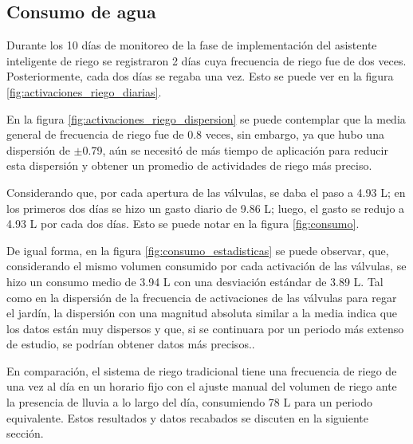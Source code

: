 \documentclass[pdflatex,sn-mathphys-num]{sn-jnl}%
\theoremstyle{thmstyleone}%
\theoremstyle{thmstyletwo}%
\theoremstyle{thmstylethree}%
\begin{document}
\begin{multicols}{2}
\justifying
\subsection*{Consumo de agua}
Durante los 10 días de monitoreo de la fase de implementación del asistente inteligente de riego se registraron 2 días cuya frecuencia de riego fue de dos veces. Posteriormente, cada dos días se regaba una vez. Esto se puede ver en la figura \ref{fig:activaciones_riego_diarias}.

En la figura \ref{fig:activaciones_riego_dispersion} se puede contemplar que la media general de frecuencia de riego fue de 0.8 veces, sin embargo, ya que hubo una dispersión de $\pm$0.79, aún se necesitó de más tiempo de aplicación para reducir esta dispersión y obtener un promedio de actividades de riego más preciso.

Considerando que, por cada apertura de las válvulas, se daba el paso a 4.93 L; en los primeros dos días se hizo un gasto diario de 9.86 L; luego, el gasto se redujo a 4.93 L por cada dos días. Esto se puede notar en la figura \ref{fig:consumo}.

De igual forma, en la figura \ref{fig:consumo_estadisticas} se puede observar,  que, considerando el mismo volumen consumido por cada activación de las válvulas, se hizo un consumo medio de 3.94 L con una desviación estándar de 3.89 L. Tal como en la dispersión de la frecuencia de activaciones de las válvulas para regar el jardín, la dispersión con una magnitud absoluta similar a la media indica que los datos están muy dispersos y que, si se continuara por un periodo más extenso de estudio, se podrían obtener datos más precisos.. 

En comparación, el sistema de riego tradicional tiene una frecuencia de riego de una vez al día en un horario fijo con el ajuste manual del volumen de riego ante la presencia de lluvia a lo largo del día, consumiendo 78 L para un periodo equivalente. Estos resultados y datos recabados se discuten en la siguiente sección.
\end{multicols}
\end{document}
